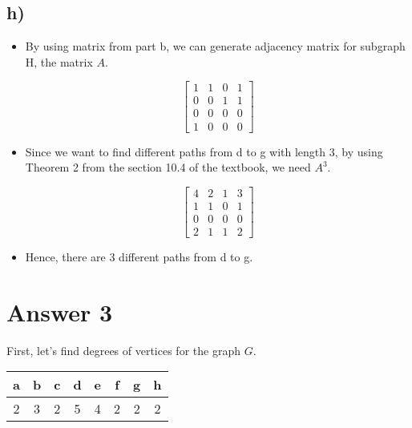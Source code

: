 \documentclass[11pt]{article}
\begin{document}
\subsection*{h)}

    \begin{itemize}
        \item By using matrix from part b, we can generate adjacency matrix for subgraph H, the matrix $A$.
            \begin{figure}[H]
            $$  
                \begin{bmatrix}{}
                    1 & 1 & 0 & 1 \\
                    0 & 0 & 1 & 1 \\
                    0 & 0 & 0 & 0 \\
                    1 & 0 & 0 & 0
                \end{bmatrix}{} 
            $$
            \end{figure}{}
        \item Since we want to find different paths from d to g with length 3, by using Theorem 2 from the section 10.4 of the textbook, we need $A^3$.
            \begin{figure}[H]
            $$  
                \begin{bmatrix}{}
                    4 & 2 & 1 & 3 \\
                    1 & 1 & 0 & 1 \\
                    0 & 0 & 0 & 0 \\
                    2 & 1 & 1 & 2
                \end{bmatrix}{} 
            $$
            \end{figure}{}
        \item Hence, there are 3 different paths from d to g.
    \end{itemize}{}

\section*{Answer 3}
    First, let's find degrees of vertices for the graph $G$.
    \begin{table}[H]
        \centering
        \begin{tabular}{c|c|c|c|c|c|c|c}
             a & b & c & d & e & f & g & h \\
             \hline
             2 & 3 & 2 & 5 & 4 & 2 & 2 & 2 
        \end{tabular}
    \end{table}{}
    
\end{document}

